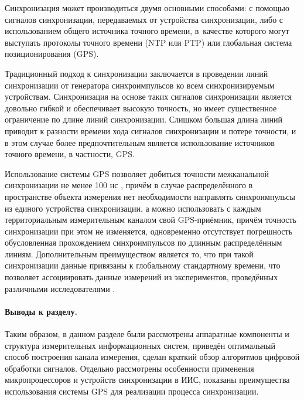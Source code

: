 \documentclass[a4paper, 14pt, titlepage]{extarticle}
\begin{document}
  Синхронизация может производиться двумя основными способами: с помощью сигналов синхронизации,
  передаваемых от устройства синхронизации, либо с использованием общего источника точного времени,
  в~качестве которого могут выступать протоколы точного времени (NTP или PTP) или глобальная система
  позиционирования (GPS).

  Традиционный подход к синхронизации заключается в проведении линий синхронизации от генератора
  синхроимпульсов ко всем синхронизируемым устройствам. Синхронизация на основе таких сигналов
  синхронизации является довольно гибкой и обеспечивает высокую точность, но имеет существенное
  ограничение по длине линий синхронизации. Слишком большая длина линий приводит к разности времени
  хода сигналов синхронизации и потере точности, и в этом случае более предпочтительным является
  использование источников точного времени, в частности, GPS.


  Использование системы GPS
  позволяет добиться точности межканальной синхронизации не менее 100 нс \cite{lombardi-gps}, причём в случае
  распределённого в пространстве объекта измерения нет необходимости направлять синхроимпульсы из
  единого устройства синхронизации, а можно использовать с каждым территориальным измерительным
  каналом свой GPS-приёмник, причём точность синхронизации при этом не изменяется,
  одновременно отсутствует погрешность обусловленная прохождением синхроимпульсов по длинным
  распределённым линиям. Дополнительным преимуществом является то, что при такой синхронизации
  данные привязаны к глобальному стандартному времени, что позволяет ассоциировать данные измерений
  из экспериментов, проведённых различными исследователями \cite{veggeberg-sync}.


  \paragraph{Выводы к разделу.}
  Таким образом, в данном разделе были рассмотрены аппаратные компоненты и структура измерительных
  информационных систем, приведён оптимальный способ построения канала измерения, сделан
  краткий обзор алгоритмов цифровой обработки сигналов. Отдельно
  рассмотрены особенности применения микропроцессоров и устройств синхронизации в ИИС,
  показаны преимущества использования системы GPS для реализации процесса синхронизации.
\end{document}
